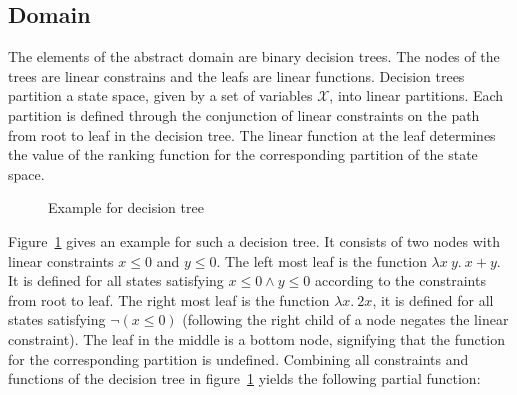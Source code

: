 \documentclass[11pt,a4paper,titlepage]{article}
\theoremstyle{definition}
\begin{document}
\subsection{Domain}

The elements of the abstract domain are binary decision trees. The nodes of the trees are linear constrains and the leafs are linear functions.
Decision trees partition a state space, given by a set of variables $\mathcal{X}$, into linear partitions. 
Each partition is defined through the conjunction of linear constraints on the path from root to leaf in the decision tree.
The linear function at the leaf determines the value of the ranking function for the corresponding partition of the state space.\\

\begin{figure}
    \centering
    \caption{Example for decision tree}
    \label{fig:decision_tree_example}
\end{figure}

Figure~\ref{fig:decision_tree_example} gives an example for such a decision tree. 
It consists of two nodes with linear constraints $x \leq 0$ and $y \leq 0$. The left most leaf is the function $\lambda x \ y. \ x + y$. 
It is defined for all states satisfying $x \leq 0 \land y \leq 0$ according to the constraints from root to leaf. 
The right most leaf is the function $\lambda x.\ 2x$, it is defined for all states satisfying $\neg (x \leq 0)$ 
(following the right child of a node negates the linear constraint). The leaf in the middle is a bottom node, 
signifying that the function for the corresponding partition is undefined. Combining all constraints and functions of
the decision tree in figure~\ref{fig:decision_tree_example} yields the following partial function:
\end{document}
